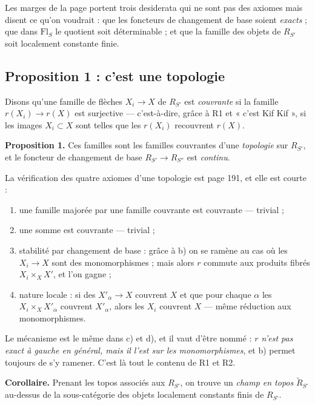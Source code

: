 \documentclass[11pt,a4paper]{article}
\begin{document}
Les marges de la page portent trois desiderata qui ne sont pas des axiomes mais
disent ce qu'on voudrait : que les foncteurs de changement de base soient
\emph{exacts} ; que dans $\mathrm{Fl}_{S}$ le quotient soit déterminable ; et
que la famille des objets de $R_{S'}$ soit localement constante finie.

\subsection*{Proposition 1 : c'est une topologie}

Disons qu'une famille de flèches $X_{i} \to X$ de $R_{S'}$ est
\emph{couvrante} si la famille $r(X_{i}) \to r(X)$ est surjective ---
c'est-à-dire, grâce à R1 et « c'est Kif Kif », si les images $X_{i} \subset X$
sont telles que les $r(X_{i})$ recouvrent $r(X)$.

\textbf{Proposition 1.} Ces familles sont les familles couvrantes d'une
\emph{topologie} sur $R_{S'}$, et le foncteur de changement de base
$R_{S'} \to R_{S''}$ est \emph{continu}.

La vérification des quatre axiomes d'une topologie est page 191, et elle est
courte :

\begin{enumerate}
  \item[a)] une famille majorée par une famille couvrante est couvrante ---
    trivial ;
  \item[b)] une somme est couvrante --- trivial ;
  \item[c)] stabilité par changement de base : grâce à b) on se ramène au cas
    où les $X_{i} \to X$ sont des monomorphismes ; mais alors $r$ commute aux
    produits fibrés $X_{i} \times_{X} X'$, et l'on gagne ;
  \item[d)] nature locale : si des $X'_{\alpha} \to X$ couvrent $X$ et que pour
    chaque $\alpha$ les $X_{i} \times_{X} X'_{\alpha}$ couvrent
    $X'_{\alpha}$, alors les $X_{i}$ couvrent $X$ --- même réduction aux
    monomorphismes.
\end{enumerate}

Le mécanisme est le même dans c) et d), et il vaut d'être nommé : \emph{$r$
n'est pas exact à gauche en général, mais il l'est sur les monomorphismes},
et b) permet toujours de s'y ramener. C'est là tout le contenu de R1 et R2.

\textbf{Corollaire.} Prenant les topos associés aux $R_{S'}$, on trouve un
\emph{champ en topos} $\tilde{R}_{S'}$ au-dessus de la sous-catégorie des
objets localement constants finis de $R_{S'}$.
\end{document}
